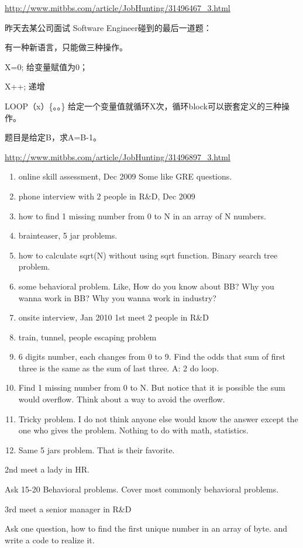 \documentclass[12pt]{book}
\begin{document}
\url{http://www.mitbbs.com/article/JobHunting/31496467_3.html}

昨天去某公司面试 Software Engineer碰到的最后一道题：

有一种新语言，只能做三种操作。

X=0;  给变量赋值为0；

X++;  递增

LOOP（x）\{。。\}   给定一个变量值就循环X次，循环block可以嵌套定义的三种操作。

题目是给定B，求A=B-1。

\url{http://www.mitbbs.com/article/JobHunting/31496897_3.html}

\begin{enumerate}
\item online skill assessment, Dec 2009 Some like GRE questions.
\item phone interview with 2 people in R\&D, Dec 2009
\item how to find 1 missing number from 0 to N in an array of N numbers.
\item brainteaser, 5 jar problems.
\item how to calculate sqrt(N) without using sqrt function. Binary search tree problem.
\item some behavioral problem. Like, How do you know about BB? Why you wanna work in BB? Why you wanna work in industry?
\item onsite interview, Jan 2010 1st meet 2 people in R\&D
\item train, tunnel, people escaping problem
\item 6 digits number, each changes from 0 to 9. Find the odds that sum
of first three is the same as the sum of last three. A: 2 do loop.
\item Find 1 missing number from 0 to N. But notice that it is possible
the sum would overflow. Think about a way to avoid the overflow.
\item Tricky problem. I do not think anyone else would know the answer except the one who gives the problem. Nothing to do with math, statistics.
\item Same 5 jars problem. That is their favorite.
\end{enumerate}

2nd meet a lady in HR.

Ask 15-20 Behavioral problems. Cover most commonly behavioral problems.

3rd meet a senior manager in R\&D

Ask one question, how to find the first unique number in an array of byte. and write a code to realize it.
\end{document}
